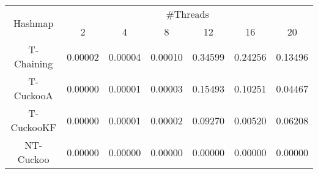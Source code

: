 \begin{tabular}{|c|c|c|c|c|c|c|}
\hline
\multirow{2}{*}{Hashmap} & \multicolumn{6}{c|}{\#Threads}\\\cline{2-7}& 2 & 4 & 8 & 12 & 16 & 20\\
\hline
\hline
T-Chaining & 0.00002 & 0.00004 & 0.00010 & 0.34599 & 0.24256 & 0.13496\\
T-CuckooA & 0.00000 & 0.00001 & 0.00003 & 0.15493 & 0.10251 & 0.04467\\
T-CuckooKF & 0.00000 & 0.00001 & 0.00002 & 0.09270 & 0.00520 & 0.06208\\
NT-Cuckoo & 0.00000 & 0.00000 & 0.00000 & 0.00000 & 0.00000 & 0.00000\\
\hline
\end{tabular}

